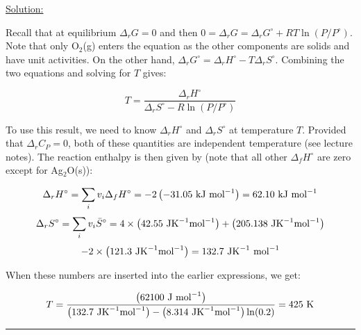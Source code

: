 \noindent
\underline{Solution:}

Recall that at equilibrium $\Delta_rG = 0$ and then $0 = \Delta_rG = \Delta_rG^\circ + RT\ln\left(P/P^\circ\right)$. Note that only O$_2$(g) enters the equation as the other components are solids and have unit activities. On the other hand, $\Delta_rG^\circ = \Delta_rH^\circ - T\Delta_rS^\circ$. Combining the two equations and solving for $T$ gives:

$$T = \frac{\Delta_rH^\circ}{\Delta_rS^\circ - R\ln\left(P/P^\circ\right)}$$

To use this result, we need to know $\Delta_rH^\circ$ and $\Delta_rS^\circ$ at temperature $T$. Provided that $\Delta_rC_P = 0$, both of these quantities are independent temperature (see lecture notes). The reaction enthalpy is then given by (note that all other $\Delta_fH^\circ$ are zero except for Ag$_2$O(s)):

$$\Delta_rH^\circ = \sum\limits_iv_i\Delta_fH^\circ = -2\left(-31.05\textnormal{ kJ mol}^{-1}\right) = 62.10\textnormal{ kJ mol}^{-1}$$
$$\Delta_rS^\circ = \sum\limits_iv_i\bar{S}^\circ = 4\times\left(42.55\textnormal{ JK}^{-1}\textnormal{mol}^{-1}\right) + \left(205.138\textnormal{ JK}^{-1}\textnormal{mol}^{-1}\right)$$
$$ - 2\times\left(121.3\textnormal{ JK}^{-1}\textnormal{mol}^{-1}\right) = 132.7\textnormal{ JK}^{-1}\textnormal{ mol}^{-1}$$

When these numbers are inserted into the earlier expressions, we get:

$$T = \frac{\left(62100\textnormal{ J mol}^{-1}\right)}{\left(132.7\textnormal{ JK}^{-1}\textnormal{mol}^{-1}\right) - \left(8.314\textnormal{ JK}^{-1}\textnormal{mol}^{-1}\right)\ln(0.2)} = 425\textnormal{ K}$$

\hrule\vspace{0.5cm}
